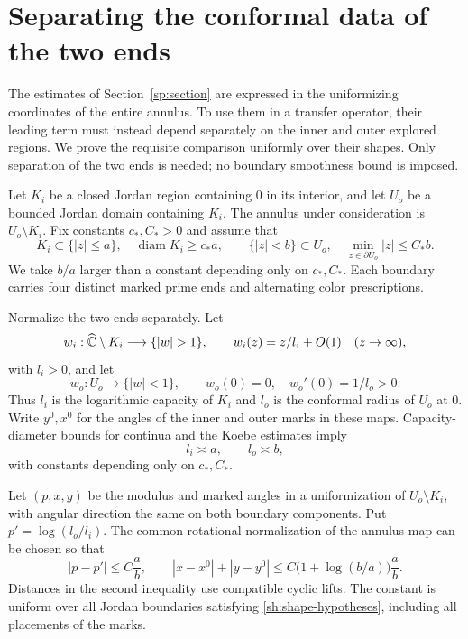 \section{Separating the conformal data of the two ends}
\label{sh:section}
\label{sec:shape}

The estimates of Section~\ref{sp:section} are expressed in the
uniformizing coordinates of the entire annulus.  To use them in a
transfer operator, their leading term must instead depend separately
on the inner and outer explored regions.  We prove the requisite
comparison uniformly over their shapes.  Only separation of the
two ends is needed; no boundary smoothness bound is imposed.

Let $K_i$ be a closed Jordan region containing $0$ in its interior,
and let $U_o$ be a bounded Jordan domain containing $K_i$.
The annulus under consideration is $U_o\setminus K_i$.
Fix constants $c_*,C_*>0$ and assume that
\begin{equation}\label{sh:shape-hypotheses}
 K_i\subset\{|z|\le a\},\quad
 \operatorname{diam}K_i\ge c_*a,\qquad
 \{|z|<b\}\subset U_o,\quad
 \min_{z\in\partial U_o}|z|\le C_*b.
\end{equation}
We take $b/a$ larger than a constant depending only on $c_*,C_*$.
Each boundary carries four distinct marked prime ends and alternating
color prescriptions.

Normalize the two ends separately.  Let
\[
 w_i:\widehat\C\setminus K_i\longrightarrow\{|w|>1\},
 \qquad w_i(z)=z/l_i+O(1)\quad(z\to\infty),
\]
with $l_i>0$, and let
\[
 w_o:U_o\longrightarrow\{|w|<1\},\qquad
 w_o(0)=0,\quad w_o'(0)=1/l_o>0.
\]
Thus $l_i$ is the logarithmic capacity of $K_i$ and $l_o$ is the
conformal radius of $U_o$ at $0$.  Write $y^0,x^0$ for the angles of
the inner and outer marks in these maps.  Capacity-diameter bounds
for continua and the Koebe estimates imply
\begin{equation}\label{sh:end-scales}
 l_i\asymp a,\qquad l_o\asymp b,
\end{equation}
with constants depending only on $c_*,C_*$.

\begin{lemma}\label{sh:comparison}
Let $(p,x,y)$ be the modulus and marked angles in a uniformization
of $U_o\setminus K_i$, with angular direction the same on both
boundary components.  Put $p'=\log(l_o/l_i)$.  The common rotational
normalization of the annulus map can be chosen so that
\begin{equation}\label{sh:comparison-estimate}
 |p-p'|\le C\frac ab,\qquad
 |x-x^0|+|y-y^0|
       \le C\bigl(1+\log(b/a)\bigr)\frac ab.
\end{equation}
Distances in the second inequality use compatible cyclic lifts.
The constant is uniform over all Jordan boundaries satisfying
\eqref{sh:shape-hypotheses}, including all placements of the marks.
\end{lemma}


